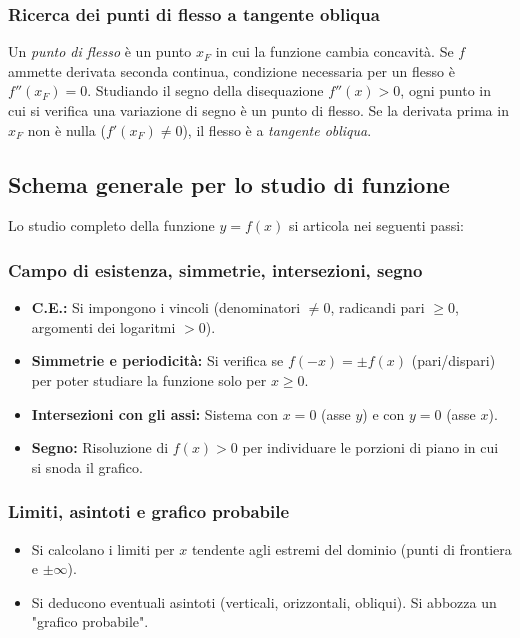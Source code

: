 \subsubsection{Ricerca dei punti di flesso a tangente obliqua}
Un \textit{punto di flesso} è un punto $x_F$ in cui la funzione cambia concavità. Se $f$ ammette derivata seconda continua, condizione necessaria per un flesso è $f''(x_F) = 0$.
Studiando il segno della disequazione $f''(x) > 0$, ogni punto in cui si verifica una variazione di segno è un punto di flesso. Se la derivata prima in $x_F$ non è nulla ($f'(x_F) \neq 0$), il flesso è a \textit{tangente obliqua}.

\subsection{Schema generale per lo studio di funzione}
Lo studio completo della funzione $y = f(x)$ si articola nei seguenti passi:
\subsubsection{Campo di esistenza, simmetrie, intersezioni, segno}
\begin{itemize}
    \item \textbf{C.E.:} Si impongono i vincoli (denominatori $\neq 0$, radicandi pari $\ge 0$, argomenti dei logaritmi $> 0$).
    \item \textbf{Simmetrie e periodicità:} Si verifica se $f(-x) = \pm f(x)$ (pari/dispari) per poter studiare la funzione solo per $x \ge 0$.
    \item \textbf{Intersezioni con gli assi:} Sistema con $x=0$ (asse $y$) e con $y=0$ (asse $x$).
    \item \textbf{Segno:} Risoluzione di $f(x) > 0$ per individuare le porzioni di piano in cui si snoda il grafico.
\end{itemize}

\subsubsection{Limiti, asintoti e grafico probabile}
\begin{itemize}
    \item Si calcolano i limiti per $x$ tendente agli estremi del dominio (punti di frontiera e $\pm\infty$).
    \item Si deducono eventuali asintoti (verticali, orizzontali, obliqui). Si abbozza un "grafico probabile".
\end{itemize}

